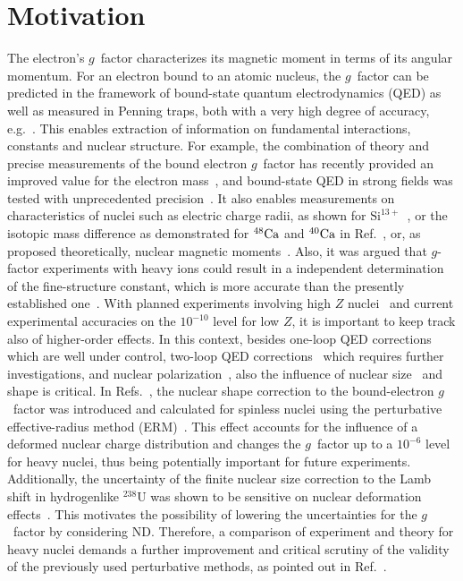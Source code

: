 \section{Motivation}
\label{sec:gfac_motiv}
The electron's $g$~factor characterizes its magnetic moment in terms of its angular momentum. For an electron bound to an atomic nucleus, the $g$~factor can be predicted in the framework of bound-state quantum electrodynamics (QED) as well as measured in Penning traps, both with a very high degree of accuracy, e.g.~\cite{Sturm2014,Sturm2011}. This enables extraction of information on fundamental interactions, constants and nuclear structure. For example, the combination of theory and precise measurements of the bound electron $g$~factor has recently provided an improved value for the electron mass~\cite{Sturm2014}, and bound-state QED in strong fields was tested with unprecedented precision~\cite{Haffner2000, Verdu2004, Kohler2015, Zatorski2017}. It also enables measurements on characteristics of nuclei such as electric charge radii, as shown for $\textrm{Si}^{13+}$~\cite{Sturm2011}, or the isotopic mass difference as demonstrated for $\null^{48} \textrm{Ca}$ and $\null^{40} \textrm{Ca}$ in Ref.~\cite{Kohler2016}, or, as proposed theoretically, nuclear magnetic moments~\cite{Yerokhin2011}.  Also, it was argued that $g$-factor experiments with heavy ions could result in a independent determination of the fine-structure constant, which is more accurate than the presently established one~\cite{Shabaev2006,yerokhin2016}.
With planned experiments involving high $Z$ nuclei~\cite{HITRAP2008,vogel2015,sturm2017} and current experimental accuracies on the $10^{-10}$ level for low $Z$, it is important to keep track also of higher-order effects. 
In this context, besides one-loop QED corrections~\cite{Yerokhin2004,yerokhin2017} which are well under control, two-loop QED corrections~\cite{Pachucki2005,yerokhin2013,czarnecki2016,czarnecki2018} which requires further investigations, and nuclear polarization~\cite{Nefiodov,volotka2014}, also the influence of nuclear size~\cite{karshenboim2000,Glazov2002} and shape is critical.
In Refs.~\cite{jacek2012, ZatorskiWorkingNotes}, the nuclear shape correction to the bound-electron $g$~factor was introduced and calculated for spinless nuclei using the perturbative effective-radius method (ERM)~\cite{Shabaev1993,kozhedub2008}. This effect accounts for the influence of a deformed nuclear charge distribution and changes the $g$~factor up to a $10^{-6}$ level for heavy nuclei, thus being potentially important for future experiments.
Additionally, the uncertainty of the finite nuclear size correction to the Lamb shift in hydrogenlike $^{238}$U was shown to be sensitive on nuclear deformation effects~\cite{kozhedub2008}.
This motivates the possibility of lowering the uncertainties for the $g$~factor by considering ND.
Therefore, a comparison of experiment and theory for heavy nuclei demands a further improvement and critical scrutiny of the validity of the previously used perturbative methods, as pointed out in Ref.~\cite{karshenboim2018}.

